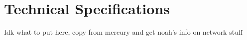 \section{Technical Specifications}

Idk what to put here, copy from mercury and get noah’s info on network stuff
